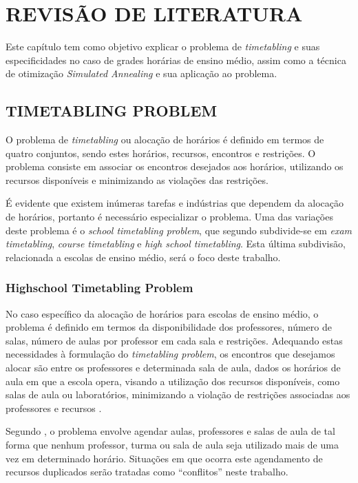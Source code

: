 
\chapter{REVISÃO DE LITERATURA}
\label{chap:fundamentacaoTeorica}

Este capítulo tem como objetivo explicar o problema de \textit{timetabling} e suas especificidades no caso de grades horárias de ensino médio, assim como a técnica de otimização \textit{Simulated Annealing} e sua aplicação ao problema.

\section{TIMETABLING PROBLEM}
O problema de \textit{timetabling} ou alocação de horários é definido em termos de quatro conjuntos, sendo estes horários, recursos, encontros e restrições. O problema consiste em associar os encontros desejados aos horários, utilizando os recursos disponíveis e minimizando as violações das restrições.

É evidente que existem inúmeras tarefas e indústrias que dependem da alocação de horários, portanto é necessário especializar o problema. Uma das variações deste problema é o \textit{school timetabling problem}, que segundo  subdivide-se em \textit{exam timetabling}, \textit{course timetabling} e \textit{high school timetabling}. Esta última subdivisão, relacionada a escolas de ensino médio, será o foco deste trabalho.

\subsection{Highschool Timetabling Problem}
No caso específico da alocação de horários para escolas de ensino médio, o problema é definido em termos da disponibilidade dos professores, número de salas, número de aulas por professor em cada sala e restrições. Adequando estas necessidades à formulação do \textit{timetabling problem}, os encontros que desejamos alocar são entre os professores e determinada sala de aula, dados os horários de aula em que a escola opera, visando a utilização dos recursos disponíveis, como salas de aula ou laboratórios, minimizando a violação de restrições associadas aos professores e recursos \cite{TAN2021113943}.

Segundo , o problema envolve agendar aulas, professores e salas de aula de tal forma que nenhum professor, turma ou sala de aula seja utilizado mais de uma vez em determinado horário. Situações em que ocorra este agendamento de recursos duplicados serão tratadas como ``conflitos'' neste trabalho.

